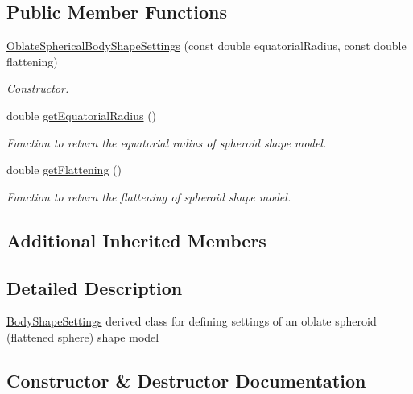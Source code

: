 \subsection*{Public Member Functions}
\begin{DoxyCompactItemize}
\item 
\hyperlink{classtudat_1_1simulation__setup_1_1OblateSphericalBodyShapeSettings_ad6768063441c5420795bffe22ee1a487}{Oblate\+Spherical\+Body\+Shape\+Settings} (const double equatorial\+Radius, const double flattening)
\begin{DoxyCompactList}\small\item\em Constructor. \end{DoxyCompactList}\item 
double \hyperlink{classtudat_1_1simulation__setup_1_1OblateSphericalBodyShapeSettings_ad9e5f7f262c5ce90fb28291b17ae7c74}{get\+Equatorial\+Radius} ()
\begin{DoxyCompactList}\small\item\em Function to return the equatorial radius of spheroid shape model. \end{DoxyCompactList}\item 
double \hyperlink{classtudat_1_1simulation__setup_1_1OblateSphericalBodyShapeSettings_a585fb851ead176b7d905f0c2b7c3702a}{get\+Flattening} ()
\begin{DoxyCompactList}\small\item\em Function to return the flattening of spheroid shape model. \end{DoxyCompactList}\end{DoxyCompactItemize}
\subsection*{Additional Inherited Members}


\subsection{Detailed Description}
\hyperlink{classtudat_1_1simulation__setup_1_1BodyShapeSettings}{Body\+Shape\+Settings} derived class for defining settings of an oblate spheroid (flattened sphere) shape model 

\subsection{Constructor \& Destructor Documentation}
